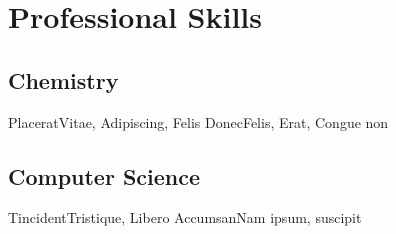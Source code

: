 \section{Professional Skills}
\subsection{Chemistry}
           {Placerat}{Vitae, Adipiscing, Felis}
           {Donec}{Felis, Erat, Congue non}

\spacesubsection
\subsection{Computer Science}
           {Tincident}{Tristique, Libero}
           {Accumsan}{Nam ipsum, suscipit}